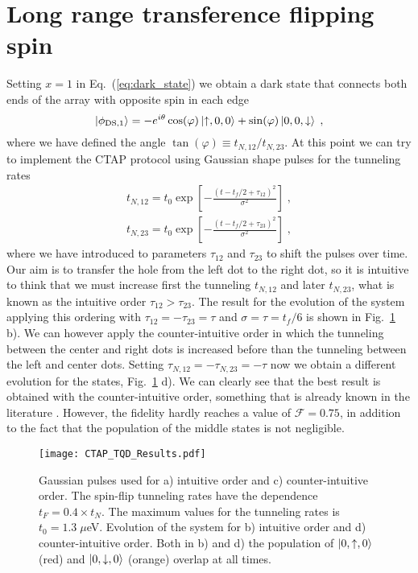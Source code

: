 \section{Long range transference flipping spin}
Setting $x=1$ in Eq.~(\ref{eq:dark_state}) we obtain a dark state that connects both ends of the array with opposite spin in each edge
\begin{equation}
\ket{\phi_{\text{DS},1}}=-e^{i\theta}\cos(\varphi)\ket{\uparrow,0,0}+\sin(\varphi)\ket{0,0,\downarrow}\; ,
\end{equation} 
where we have defined the angle $\tan(\varphi)\equiv t_{N,12}/t_{N,23}$. At this point we can try to implement the CTAP protocol using Gaussian shape pulses for the tunneling rates
\begin{equation}
\begin{split}
t_{N,12}=t_0\exp[-\frac{(t-t_f/2+\tau_{12})^2}{\sigma^2}]\; ,\\
t_{N,23}=t_0\exp[-\frac{(t-t_f/2+\tau_{23})^2}{\sigma^2}]\; ,
\end{split}
\end{equation}
where we have introduced to parameters $\tau_{12}$ and $\tau_{23}$ to shift the pulses over time. Our aim is to transfer the hole from the left dot to the right dot, so it is intuitive to think that we must increase first the tunneling $t_{N,12}$ and later $t_{N,23}$, what is known as the intuitive order $\tau_{12}>\tau_{23}$. The result for the evolution of the system applying this ordering with $\tau_{12}=-\tau_{23}=\tau$ and $\sigma=\tau=t_f/6$ is shown in Fig.~\ref{fig:CTAP_TQD_Results} b). We can however apply the counter-intuitive order in which the tunneling between the center and right dots is increased before than the tunneling between the left and center dots. Setting $\tau_{N,12}=-\tau_{N,23}=-\tau$ now we obtain a different evolution for the states, Fig.~\ref{fig:CTAP_TQD_Results} d). We can clearly see that the best result is obtained with the counter-intuitive order, something that is already known in the literature \cite{Greentree2004}. However, the fidelity hardly reaches a value of $\mathcal{F}=0.75$, in addition to the fact that the population of the middle states is not negligible.
\begin{figure}[!htb]
	\centering
	\texttt{[image: CTAP\_TQD\_Results.pdf]}
	\caption{Gaussian pulses used for a) intuitive order and c) counter-intuitive order. The spin-flip tunneling rates have the dependence $t_F=0.4\times t_N$. The maximum values for the tunneling rates is $t_0=1.3\; \mu$eV. Evolution of the system for b) intuitive order and d) counter-intuitive order. Both in b) and d) the population of $\ket{0,\uparrow,0}$ (red) and $\ket{0,\downarrow,0}$ (orange) overlap at all times.}
	\label{fig:CTAP_TQD_Results}
\end{figure}

